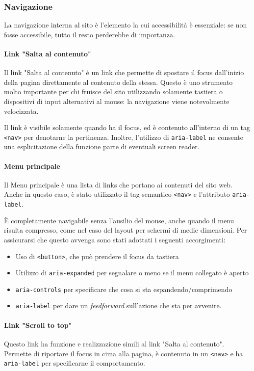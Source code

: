 \subsubsection{Navigazione}
La navigazione interna al sito è l'elemento la cui accessibilità è essenziale: se non fosse accessibile, tutto il resto perderebbe di importanza.
\paragraph{Link "Salta al contenuto"} Il link "Salta al contenuto" è un link che permette di spostare il focus dall'inizio della pagina direttamente al contenuto della stessa. Questo è uno strumento molto importante per chi fruisce del sito utilizzando solamente tastiera o dispositivi di input alternativi al mouse: la navigazione viene notevolmente velocizzata.

Il link è visibile solamente quando ha il focus, ed è contenuto all'interno di un tag \verb|<nav>| per denotarne la pertinenza. Inoltre, l'utilizzo di \verb|aria-label| ne consente una esplicitazione della funzione parte di eventuali screen reader.

\paragraph{Menu principale}
Il Menu principale è una lista di links che portano ai contenuti del sito web. Anche in questo caso, è stato utilizzato il tag semantico \verb|<nav>| e l'attributo \verb|aria-label|.

È completamente navigabile senza l'ausilio del mouse, anche quando il menu risulta compresso, come nel caso del layout per schermi di medie dimensioni. Per assicurarsi che questo avvenga sono stati adottati i seguenti accorgimenti:
\begin{itemize}
    \item Uso di \verb|<button>|, che può prendere il focus da tastiera
    \item Utilizzo di \verb|aria-expanded| per segnalare o meno se il menu collegato è aperto
    \item \verb|aria-controls| per specificare che cosa si sta espandendo/comprimendo
    \item \verb|aria-label| per dare un \textit{feedforward} sull'azione che sta per avvenire.
\end{itemize}
\paragraph{Link "Scroll to top"}
Questo link ha funzione e realizzazione simili al link "Salta al contenuto". Permette di riportare il focus in cima alla pagina, è contenuto in un \verb|<nav>| e ha \verb|aria-label| per specificarne il comportamento.

